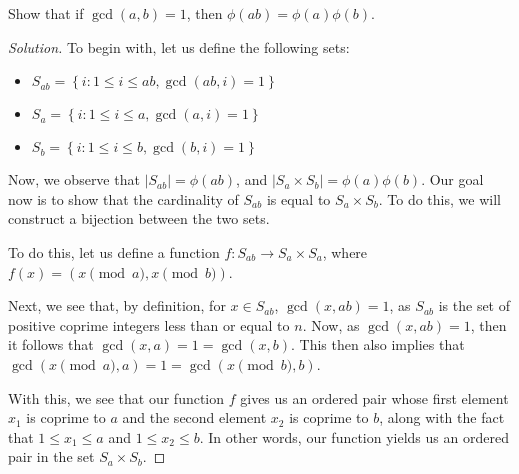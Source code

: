 \documentclass{article}
\newenvironment{solution}{\begin{proof}[Solution]}{\end{proof}}
\newcommand{\ZZ}{\mathbb{Z}}
\begin{document}
\begin{hw}
	Show that if $\gcd(a,b)=1$, then $\phi(ab)=\phi(a)\phi(b)$.
\end{hw}
\begin{solution}
	
	
%	
%	

	To begin with, let us define the following sets:
	\begin{itemize}
		\item $S_{ab} = \left\{  i : 1 \leq i \leq ab, \gcd(ab, i) = 1 \right\}$
		\item $S_{a} = \left\{  i : 1 \leq i \leq a, \gcd(a, i) = 1 \right\}$
		\item $S_{b} = \left\{  i : 1 \leq i \leq b, \gcd(b, i) = 1 \right\}$
	\end{itemize}
	
	Now, we observe that $\lvert S_{ab} \rvert = \phi(ab)$, and $\lvert S_{a} \times S_{b} \rvert = \phi(a)\phi(b)$. Our goal now is to show that the cardinality of $S_{ab}$ is equal to $S_{a} \times S_{b}$. To do this, we will construct a bijection between the two sets.
	
	To do this, let us define a function $f : S_{ab} \rightarrow S_{a} \times S_{a}$, where $f(x) = (x \pmod{a}, x \pmod{b})$.
	
	Next, we see that, by definition, for $x \in S_{ab}$, $\gcd(x, ab) = 1$, as $S_{ab}$ is the set of positive coprime integers less than or equal to $n$. Now, as $\gcd(x, ab) = 1$, then it follows that $\gcd(x, a) = 1 = \gcd(x, b)$. This then also implies that $\gcd(x \pmod{a}, a) = 1 = \gcd(x \pmod{b}, b)$.
	
	With this, we see that our function $f$ gives us an ordered pair whose first element $x_{1}$ is coprime to $a$ and the second element $x_{2}$ is coprime to $b$, along with the fact that $1 \leq x_{1} \leq a$ and $1 \leq x_{2} \leq b$. In other words, our function yields us an ordered pair in the set $S_{a} \times S_{b}$.
	

\end{solution}
\end{document}
